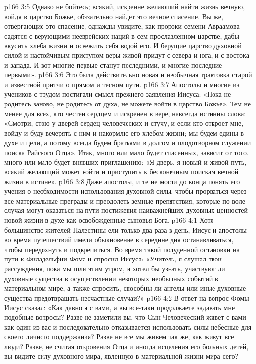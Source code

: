 \vs p166 3:5 Однако не бойтесь; всякий, искренне желающий найти жизнь вечную, войдя в царство Божье, обязательно найдет это вечное спасение. Вы же, отвергающие это спасение, однажды увидите, как пророки семени Авраамова садятся с верующими нееврейских наций в сем прославленном царстве, дабы вкусить хлеба жизни и освежить себя водой его. И берущие царство духовной силой и настойчивым приступом веры живой придут с севера и юга, и с востока и запада. И вот многие первые станут последними, и многие последние первыми».
\vs p166 3:6 Это была действительно новая и необычная трактовка старой и известной притчи о прямом и тесном пути.
\vs p166 3:7 Апостолы и многие из учеников с трудом постигали смысл прежнего заявления Иисуса: «Пока не родитесь заново, не родитесь от духа, не можете войти в царство Божье». Тем не менее для всех, кто честен сердцем и искренен в вере, навсегда истинны слова: «Смотри, стою у дверей сердец человеческих и стучу, и если кто откроет мне, войду и буду вечерять с ним и накормлю его хлебом жизни; мы будем едины в духе и цели, а потому всегда будем братьями в долгом и плодотворном служении поиска Райского Отца». Итак, много или мало будет спасенных, зависит от того, много или мало будет внявших приглашению: «Я\hyp{}дверь, я\hyp{}новый и живой путь, всякий желающий может войти и приступить к бесконечным поискам вечной жизни в истине».
\vs p166 3:8 Даже апостолы, и те не могли до конца понять его учения о необходимости использования духовной силы, чтобы прорваться через все материальные преграды и преодолеть земные препятствия, которые по воле случая могут оказаться на пути постижения наиважнейших духовных ценностей новой жизни в духе как освобожденные сыновья Бога.
\vs p166 4:1 Хотя большинство жителей Палестины ели только два раза в день, Иисус и апостолы во время путешествий имели обыкновение в середине дня останавливаться, чтобы передохнуть и подкрепиться. Во время такой полуденной остановки на пути к Филадельфии Фома и спросил Иисуса: «Учитель, я слушал твои рассуждения, пока мы шли этим утром, и хотел бы узнать, участвуют ли духовные существа в осуществлении некоторых необычных событий в материальном мире, а также спросить, способны ли ангелы или иные духовные существа предотвращать несчастные случаи?»
\vs p166 4:2 \pc В ответ на вопрос Фомы Иисус сказал: «Как давно я с вами, а вы все\hyp{}таки продолжаете задавать мне подобные вопросы? Разве не заметили вы, что Сын Человеческий живет с вами как один из вас и последовательно отказывается использовать силы небесные для своего личного поддержания? Разве не все мы живем так же, как живут все люди? Разве, не считая откровения Отца и иногда исцеления его больных детей, вы видите силу духовного мира, явленную в материальной жизни мира сего?
